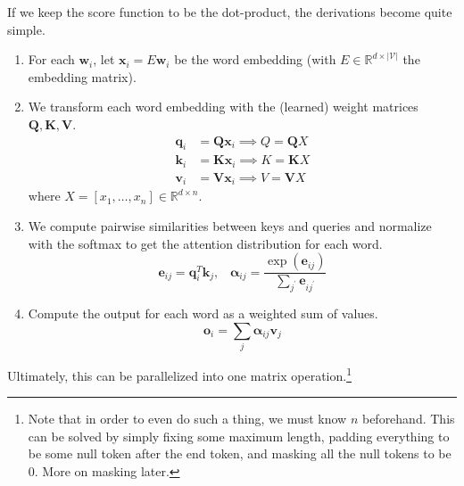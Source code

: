 \documentclass{article}
\begin{document}
      \begin{definition}
        If we keep the score function to be the dot-product, the derivations become quite simple. 
        \begin{enumerate}
          \item For each $\mathbf{w}_i$, let $\mathbf{x}_i = E \mathbf{w}_i$ be the word embedding (with $E \in \mathbb{R}^{d \times |\mathcal{V}|}$ the embedding matrix). 

          \item We transform each word embedding with the (learned) weight matrices $\mathbf{Q}, \mathbf{K}, \mathbf{V}$. 
          \begin{align*} 
            \mathbf{q}_i & = \mathbf{Q} \mathbf{x}_i \implies Q = \mathbf{Q} X \\
            \mathbf{k}_i & = \mathbf{K} \mathbf{x}_i \implies K = \mathbf{K} X \\
            \mathbf{v}_i & = \mathbf{V} \mathbf{x}_i \implies V = \mathbf{V} X 
          \end{align*}
          where $X = [x_1, \ldots, x_n] \in \mathbb{R}^{d \times n}$.  

          \item We compute pairwise similarities between keys and queries and normalize with the softmax to get the attention distribution for each word. 
            \begin{equation}
              \mathbf{e}_{ij} = \mathbf{q}_i^T \mathbf{k}_j , \;\;\; \boldsymbol{\alpha}_{ij} = \frac{\exp(\mathbf{e}_{ij})}{\sum_{j^\prime} \mathbf{e}_{i j^\prime}}
            \end{equation}

          \item Compute the output for each word as a weighted sum of values. 
            \begin{equation}
              \mathbf{o}_i = \sum_j \boldsymbol{\alpha}_{ij} \mathbf{v}_j 
            \end{equation}
        \end{enumerate}

        Ultimately, this can be parallelized into one matrix operation.\footnote{Note that in order to even do such a thing, we must know $n$ beforehand. This can be solved by simply fixing some maximum length, padding everything to be some null token after the end token, and masking all the null tokens to be $0$. More on masking later. } 


\end{definition}
\end{document}

